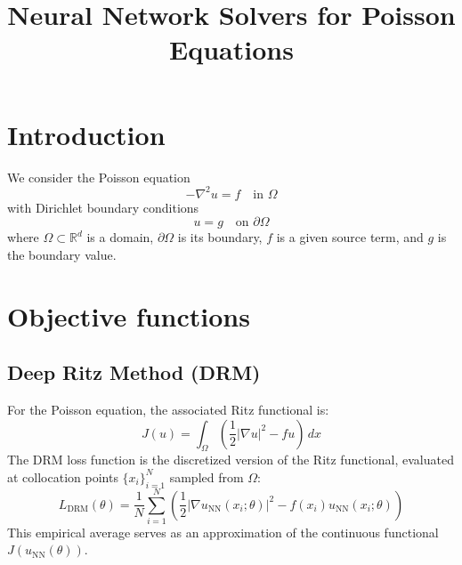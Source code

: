 \documentclass{article}
\title{Neural Network Solvers for Poisson Equations}
\author{}
\date{}
\begin{document}
\maketitle

\section{Introduction}
We consider the Poisson equation
$$-\nabla^2 u = f \quad \text{in } \Omega$$
with Dirichlet boundary conditions
$$u = g \quad \text{on } \partial \Omega$$
where $\Omega \subset \mathbb{R}^d$ is a domain, $\partial \Omega$ is its boundary, $f$ is a given source term, and $g$ is the boundary value.

\section{Objective functions}

\subsection{Deep Ritz Method (DRM)}

For the Poisson equation, the associated Ritz functional is:
$$J(u) = \int_{\Omega} \left( \frac{1}{2} |\nabla u|^2 - fu \right) \, dx$$
The DRM loss function is the discretized version of the Ritz functional, evaluated at collocation points $\{x_i\}_{i=1}^N$ sampled from $\Omega$:
$$L_{\text{DRM}}(\theta) = \frac{1}{N} \sum_{i=1}^N \left( \frac{1}{2} |\nabla u_{\text{NN}}(x_i; \theta)|^2 - f(x_i) u_{\text{NN}}(x_i; \theta) \right)$$
This empirical average serves as an approximation of the continuous functional $J(u_{\text{NN}}(\theta))$.
\end{document}
